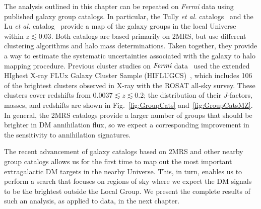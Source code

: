 The analysis outlined in this chapter can be repeated on \emph{Fermi} data using published galaxy group catalogs.  In particular, the Tully \emph{et al.} catalogs~\cite{Tully:2015opa,2017ApJ...843...16K} and the Lu \emph{et al.} catalog~\cite{Lu:2016vmu} provide a map of the galaxy groups in the local Universe within $z\lesssim0.03$.  Both catalogs are based primarily on 2MRS, but use different clustering algorithms and halo mass determinations.  
Taken together, they provide a way to estimate the systematic uncertainties associated with the galaxy to halo mapping procedure.  Previous cluster studies on $\emph{Fermi}$ data~\cite{Ackermann:2010rg, Ando:2012vu,Ackermann:2013iaq,Anderson:2015dpc,Liang:2016pvm} used the extended HIghest X-ray FLUx Galaxy Cluster Sample (HIFLUGCS)~\cite{Reiprich:2001zv,Chen:2007sz}, which includes 106 of the brightest clusters observed in X-ray with the ROSAT all-sky survey.  These clusters cover redshifts from $0.0037 \lesssim z\lesssim 0.2$; the distribution of their $J$-factors, masses, and redshifts are shown in Fig.~\ref{fig:GroupCats} and~\ref{fig:GroupCatsMZ}.  In general, the 2MRS catalogs provide a larger number of groups that should be brighter in DM annihilation flux, so we expect a corresponding improvement in the sensitivity to annihilation signatures.  

The recent advancement of galaxy catalogs based on 2MRS and other nearby group catalogs allows us for the first time to map out the most important extragalactic DM targets in the nearby Universe.  This, in turn, enables us to perform a search that focuses on regions of sky where we expect the DM signals to be the brightest outside the Local Group.  We present the complete results of such an analysis, as applied to data, in the next chapter.

\sectionline

